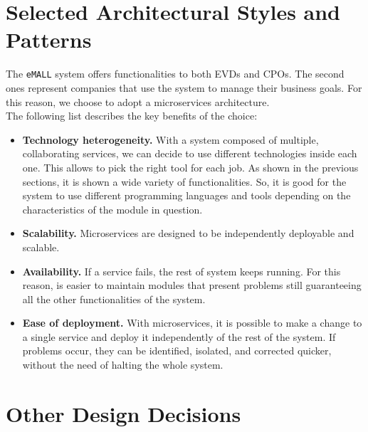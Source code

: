 \section{Selected Architectural Styles and Patterns}
\label{sec: patterns}%
The \verb|eMALL| system offers functionalities to both EVDs and CPOs.
The second ones represent companies that use the system to manage their business goals.
For this reason, we choose to adopt a microservices architecture. \\
The following list describes the key benefits of the choice:
\begin{itemize}
    \item \textbf{Technology heterogeneity.} With a system composed of multiple, collaborating services, we can decide to use different
    technologies inside each one.
    This allows to pick the right tool for each job.
    As shown in the previous sections, it is shown a wide variety of functionalities.
    So, it is good for the system to use different programming languages and tools depending on the characteristics of
    the module in question.
    \item \textbf{Scalability.} Microservices are designed to be independently deployable and scalable.
    \item \textbf{Availability.} If a service fails, the rest of system keeps running.
    For this reason, is easier to maintain modules that present problems still guaranteeing all the other functionalities
    of the system.
    \item \textbf{Ease of deployment.} With microservices, it is possible to make a change to a single service and deploy
    it independently of the rest of the system.
    If problems occur, they can be identified, isolated, and corrected quicker, without the need of halting the whole system.
\end{itemize}


\section{Other Design Decisions}
\label{sec: other_design_decisions}%
